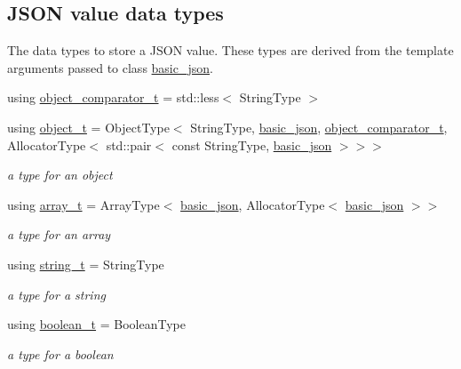\subsection*{J\+S\+ON value data types}
\label{_amgrpbddfba6d49869d59bfd397e65b8cba87}%
The data types to store a J\+S\+ON value. These types are derived from the template arguments passed to class \hyperlink{classnlohmann_1_1basic__json}{basic\+\_\+json}. \begin{DoxyCompactItemize}
\item 
using \hyperlink{classnlohmann_1_1basic__json_abed9e77c5fcfc925fcdd489911069c3b}{object\+\_\+comparator\+\_\+t} = std\+::less$<$ String\+Type $>$
\item 
using \hyperlink{classnlohmann_1_1basic__json_a0322396ca5cd4623bc816bf735377623}{object\+\_\+t} = Object\+Type$<$ String\+Type, \hyperlink{classnlohmann_1_1basic__json}{basic\+\_\+json}, \hyperlink{classnlohmann_1_1basic__json_abed9e77c5fcfc925fcdd489911069c3b}{object\+\_\+comparator\+\_\+t}, Allocator\+Type$<$ std\+::pair$<$ const String\+Type, \hyperlink{classnlohmann_1_1basic__json}{basic\+\_\+json} $>$$>$$>$
\begin{DoxyCompactList}\small\item\em a type for an object \end{DoxyCompactList}\item 
using \hyperlink{classnlohmann_1_1basic__json_a4c409f1b6d9caf3412c78af9a5883fed}{array\+\_\+t} = Array\+Type$<$ \hyperlink{classnlohmann_1_1basic__json}{basic\+\_\+json}, Allocator\+Type$<$ \hyperlink{classnlohmann_1_1basic__json}{basic\+\_\+json} $>$$>$
\begin{DoxyCompactList}\small\item\em a type for an array \end{DoxyCompactList}\item 
using \hyperlink{classnlohmann_1_1basic__json_a61f8566a1a85a424c7266fb531dca005}{string\+\_\+t} = String\+Type
\begin{DoxyCompactList}\small\item\em a type for a string \end{DoxyCompactList}\item 
using \hyperlink{classnlohmann_1_1basic__json_a4c919102a9b4fe0d588af64801436082}{boolean\+\_\+t} = Boolean\+Type
\begin{DoxyCompactList}\small\item\em a type for a boolean \end{DoxyCompactList}\item 
$$
\end{DoxyCompactItemize}
